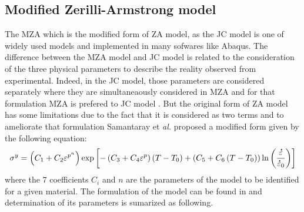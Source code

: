 \documentclass[twoside,english,1p,final,sort&compress]{elsarticle}
\makeatletter
\theoremstyle{plain}
\DeclareRobustCommand{\mdot}[1]{\accentset{\mbox{\bfseries .}}{#1}}
\DeclareRobustCommand{\eal}{et \emph{al.}\@\xspace}
\makeatother
\begin{document}
\subsection{Modified Zerilli-Armstrong model\label{sec:MZA}}
The MZA which is the modified form of ZA model, as the JC model is one of widely used models and implemented in many sofwares like Abaqus.
The difference between the MZA model and JC model is related to the consideration of the three physical parameters to describe the reality observed from experimental.
Indeed, in the JC model, those parameters are considered separately where they are simultaneaously considered in MZA and for that formulation MZA is prefered to JC model \cite{Hull-2011}.
But the original form of ZA model has some limitations due to the fact that it is considered as two terms and to ameliorate that formulation Samantaray \eal \cite{Samantaray-2009} proposed a modified form given by the following equation:
\begin{equation}
\label{eq:MZA-model}
\sigma^y = \left(C_{1}+C_{2}\varepsilon^{p^n}\right) \exp\left[-\left(C_{3}+C_{4}\varepsilon^p\right)\left(T-T_0\right) + \left(C_{5}+C_{6}\left(T-T_0\right)\right)\ln\left( \frac{\mdot\varepsilon}{\mdot{\varepsilon}_0}\right)\right]
\end{equation}
where the $7$ coefficients $C_i$ and $n$ are the parameters of the model to be identified for a given material.
The formulation of the model can be found in \cite{Samantaray-2009} and determination of its parameters is sumarized as following.
\end{document}
